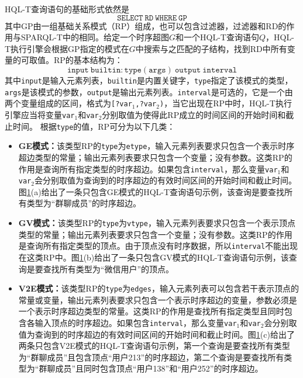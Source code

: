 HQL-T查询语句的基础形式依然是
\begin{equation}
    \mathtt{SELECT \ RD \ WHERE \ GP}
\end{equation}
其中GP由一组基础关系模式（RP）组成，也可以包含过滤器，过滤器和RD的作用与SPARQL-T中的相同。给定一个时序超图$G$和一个HQL-T查询语句$Q$，HQL-T执行引擎会根据GP指定的模式在$G$中搜索与之匹配的子结构，找到RD中所有变量的可取值。RP的基本结构为：
\begin{equation}
    \mathtt{input \ builtin\colon \! type(args) \ output \ interval}
\end{equation}
其中\texttt{input}是输入元素列表，\texttt{builtin}是内置关键字，\texttt{type}指定了该模式的类型，\texttt{args}是该模式的参数，\texttt{output}是输出元素列表。\texttt{interval}是可选的，它是一个由两个变量组成的区间，格式为\texttt{[?var$_1$,?var$_2$)}，当它出现在RP中时，HQL-T执行引擎应当将变量\texttt{var$_1$}和\texttt{var$_2$}分别取值为使得此RP成立的时间区间的开始时间和截止时间。
根据\texttt{type}的值，RP可分为以下几类：

\begin{figure}[!htb]
\label{hql1}
\end{figure}

\begin{itemize}
\item \textbf{GE模式：}该类型RP的\texttt{type}为\texttt{etype}，输入元素列表要求只包含一个表示时序超边类型的常量；输出元素列表要求只包含一个变量；没有参数。这类RP的作用是查询所有指定类型的时序超边。如果包含\texttt{interval}，那么变量\texttt{var$_1$}和\texttt{var$_2$}会分别取值为查询到的时序超边的有效时间区间的开始时间和截止时间。图\ref{hql1}(a)给出了一条只包含GE模式的HQL-T查询语句示例，该查询是要查找所有类型为“群聊成员”的时序超边。
\item \textbf{GV模式：}该类型RP的\texttt{type}为\texttt{vtype}，输入元素列表要求只包含一个表示顶点类型的常量；输出元素列表要求只包含一个变量；没有参数。这类RP的作用是查询所有指定类型的顶点。由于顶点没有时序数据，所以\texttt{interval}不能出现在这类RP中。图\ref{hql1}(b)给出了一条只包含GV模式的HQL-T查询语句示例，该查询是要查找所有类型为“微信用户”的顶点。
\item \textbf{V2E模式：}该类型RP的\texttt{type}为\texttt{edges}，输入元素列表可以包含若干表示顶点的常量或变量，输出元素列表要求只包含一个表示时序超边的变量，参数必须是一个表示时序超边类型的常量。这类RP的作用是查找所有指定类型且同时包含各输入顶点的时序超边。如果包含\texttt{interval}，那么变量\texttt{var$_1$}和\texttt{var$_2$}会分别取值为查询到的时序超边的有效时间区间的开始时间和截止时间。图\ref{hql1}(c)给出了两条只包含V2E模式的HQL-T查询语句示例，第一个查询是要查找所有类型为“群聊成员”且包含顶点“用户213”的时序超边，第二个查询是要查找所有类型为“群聊成员”且同时包含顶点“用户138”和“用户252”的时序超边。
\end{itemize}

